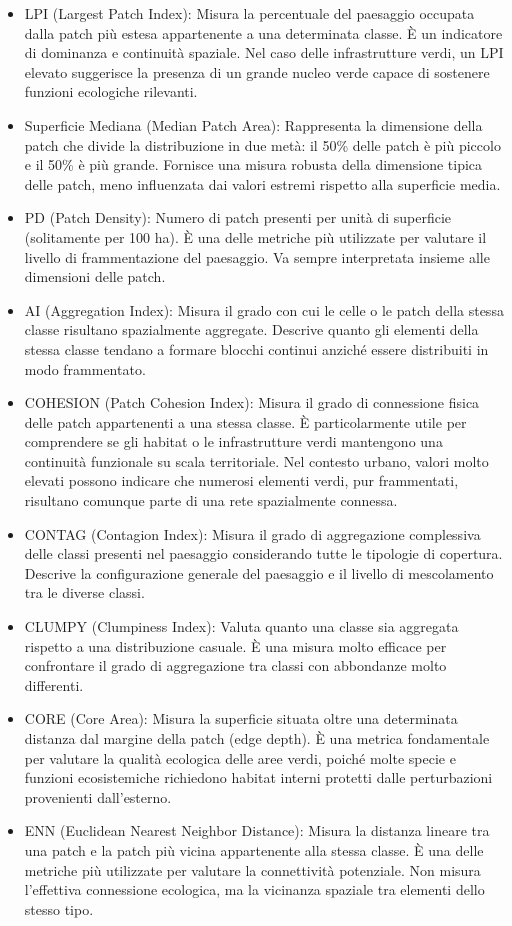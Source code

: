 \documentclass[
  a4paper,
]{book}
\providecommand{\tightlist}{%
  \setlength{\itemsep}{0pt}\setlength{\parskip}{0pt}}
\begin{document}
\begin{itemize}
\tightlist
\item
  LPI (Largest Patch Index): Misura la percentuale del paesaggio occupata dalla patch più estesa appartenente a una determinata classe. È un indicatore di dominanza e continuità spaziale. Nel caso delle infrastrutture verdi, un LPI elevato suggerisce la presenza di un grande nucleo verde capace di sostenere funzioni ecologiche rilevanti.
\item
  Superficie Mediana (Median Patch Area): Rappresenta la dimensione della patch che divide la distribuzione in due metà: il 50\% delle patch è più piccolo e il 50\% è più grande. Fornisce una misura robusta della dimensione tipica delle patch, meno influenzata dai valori estremi rispetto alla superficie media.
\item
  PD (Patch Density): Numero di patch presenti per unità di superficie (solitamente per 100 ha). È una delle metriche più utilizzate per valutare il livello di frammentazione del paesaggio. Va sempre interpretata insieme alle dimensioni delle patch.
\item
  AI (Aggregation Index): Misura il grado con cui le celle o le patch della stessa classe risultano spazialmente aggregate. Descrive quanto gli elementi della stessa classe tendano a formare blocchi continui anziché essere distribuiti in modo frammentato.
\item
  COHESION (Patch Cohesion Index): Misura il grado di connessione fisica delle patch appartenenti a una stessa classe. È particolarmente utile per comprendere se gli habitat o le infrastrutture verdi mantengono una continuità funzionale su scala territoriale. Nel contesto urbano, valori molto elevati possono indicare che numerosi elementi verdi, pur frammentati, risultano comunque parte di una rete spazialmente connessa.
\item
  CONTAG (Contagion Index): Misura il grado di aggregazione complessiva delle classi presenti nel paesaggio considerando tutte le tipologie di copertura. Descrive la configurazione generale del paesaggio e il livello di mescolamento tra le diverse classi.
\item
  CLUMPY (Clumpiness Index): Valuta quanto una classe sia aggregata rispetto a una distribuzione casuale. È una misura molto efficace per confrontare il grado di aggregazione tra classi con abbondanze molto differenti.
\item
  CORE (Core Area): Misura la superficie situata oltre una determinata distanza dal margine della patch (edge depth). È una metrica fondamentale per valutare la qualità ecologica delle aree verdi, poiché molte specie e funzioni ecosistemiche richiedono habitat interni protetti dalle perturbazioni provenienti dall'esterno.
\item
  ENN (Euclidean Nearest Neighbor Distance): Misura la distanza lineare tra una patch e la patch più vicina appartenente alla stessa classe. È una delle metriche più utilizzate per valutare la connettività potenziale. Non misura l'effettiva connessione ecologica, ma la vicinanza spaziale tra elementi dello stesso tipo.
\end{itemize}
\end{document}
